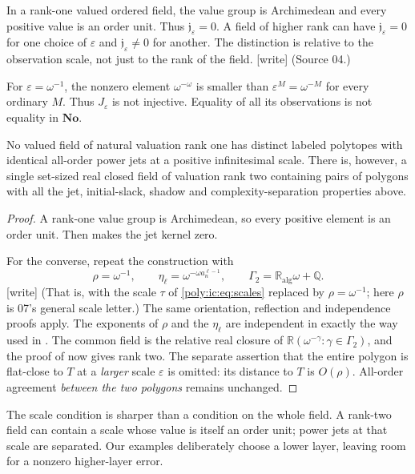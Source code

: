 \documentclass[11pt,a4paper]{article}
\numberwithin{equation}{section}
\theoremstyle{plain}
\newcommand{\wtag}{\textup{[write]}}%
\newcommand{\No}{\mathbf{No}}
\newcommand{\R}{\mathbb R}
\newcommand{\Q}{\mathbb Q}
\newcommand{\eps}{\varepsilon}
\newcommand{\JJ}{\mathfrak j}
\newcommand{\alg}{\mathrm{alg}}
\begin{document}
In a rank-one valued ordered field, the value group is Archimedean and
every positive value is an order unit. Thus $\JJ_\eps=0$. A field of higher
rank can have $\JJ_\eps=0$ for one choice of $\eps$ and $\JJ_\eps\neq0$ for another.
The distinction is relative to the observation scale, not just to the
rank of the field. \wtag{} (Source 04.)

\begin{example}
For $\eps=\omega^{-1}$, the nonzero element $\omega^{-\omega}$ is smaller
than $\eps^M=\omega^{-M}$ for every ordinary $M$. Thus $J_\eps$ is not
injective. Equality of all its observations is not equality in $\No$.
\end{example}

\begin{corollary}
\label{poly:ic:cor:ranktwo}
No valued field of natural valuation rank one has distinct labeled
polytopes with identical all-order power jets at a positive infinitesimal
scale. There is, however, a single set-sized real closed field of valuation
rank two containing pairs of polygons with all the jet, initial-slack,
shadow and complexity-separation properties above.
\end{corollary}
\begin{proof}
A rank-one value group is Archimedean, so every positive element is an
order unit. Then  makes the jet kernel zero.

For the converse, repeat the construction with
\[
 \rho=\omega^{-1},\qquad
 \eta_\ell=\omega^{-\omega a_n^{\ell-1}},
 \qquad
 \Gamma_2=\R_\alg\omega+\Q.
\]
\wtag{} (That is, with the scale $\tau$ of \eqref{poly:ic:eq:scales}
replaced by $\rho=\omega^{-1}$; here $\rho$ is 07's general scale letter.)
The same orientation, reflection and independence proofs apply.
The exponents of $\rho$ and the $\eta_\ell$ are independent in exactly
the way used in . The common field is the relative
real closure of $\R(\omega^{-\gamma}:\gamma\in\Gamma_2)$, and the proof
of  now gives rank two. The separate assertion that
the entire polygon is flat-close to $T$ at a \emph{larger} scale $\eps$
is omitted: its distance to $T$ is $O(\rho)$. All-order agreement
\emph{between the two polygons} remains unchanged.
\end{proof}

The scale condition is sharper than a condition on the whole field.
A rank-two field can contain a scale whose value is itself an order
unit; power jets at that scale are separated. Our examples deliberately
choose a lower layer, leaving room for a nonzero higher-layer error.
\end{document}
